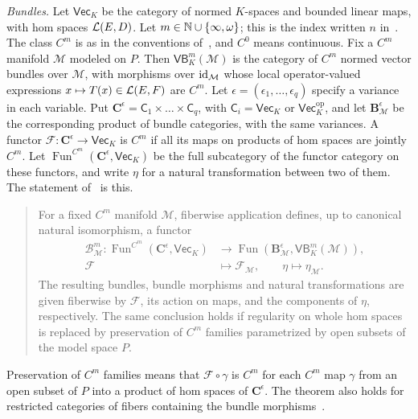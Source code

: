 \emph{Bundles.} Let $\mathsf{Vec}_K$ be the category of normed $K$-spaces and bounded linear maps, with hom spaces $\mathcal L(E,D)$. Let $m\in\mathbb N\cup\{\infty,\omega\}$; this is the index written $n$ in~\cite{I}. The class $C^m$ is as in the conventions of~\cite[Section~1]{I}, and $C^0$ means continuous. Fix a $C^m$ manifold $\mathcal M$ modeled on $P$. Then $\mathsf{VB}^m_K(\mathcal M)$ is the category of $C^m$ normed vector bundles over $\mathcal M$, with morphisms over $\mathrm{id}_{\mathcal M}$ whose local operator-valued expressions $x\mapsto T(x)\in\mathcal L(E,F)$ are $C^m$. Let $\epsilon=(\epsilon_1,\dots,\epsilon_q)$ specify a variance in each variable. Put $\mathbf C^\epsilon=\mathsf C_1\times\dots\times\mathsf C_q$, with $\mathsf C_i=\mathsf{Vec}_K$ or $\mathsf{Vec}_K^{\mathrm{op}}$, and let $\mathbf B^\epsilon_{\mathcal M}$ be the corresponding product of bundle categories, with the same variances. A functor $\mathcal F\colon\mathbf C^\epsilon\to\mathsf{Vec}_K$ is $C^m$ if all its maps on products of hom spaces are jointly $C^m$. Let $\operatorname{Fun}^{C^m}(\mathbf C^\epsilon,\mathsf{Vec}_K)$ be the full subcategory of the functor category on these functors, and write $\eta$ for a natural transformation between two of them. The statement of~\cite[Theorem~2.1]{I} is this.
\begin{quote}
For a fixed $C^m$ manifold $\mathcal M$, fiberwise application defines, up to canonical natural isomorphism, a functor
\[
\begin{aligned}
 \mathcal B^m_{\mathcal M}\colon
 \operatorname{Fun}^{C^m}(\mathbf C^\epsilon,\mathsf{Vec}_K)
 &\longrightarrow
 \operatorname{Fun}(\mathbf B^\epsilon_{\mathcal M},\mathsf{VB}^m_K(\mathcal M)),\\
 \mathcal F&\longmapsto\mathcal F_{\mathcal M},\qquad
 \eta\longmapsto\eta_{\mathcal M}.
\end{aligned}
\]
The resulting bundles, bundle morphisms and natural transformations are given fiberwise by $\mathcal F$, its action on maps, and the components of $\eta$, respectively. The same conclusion holds if regularity on whole hom spaces is replaced by preservation of $C^m$ families parametrized by open subsets of the model space $P$.
\end{quote}
Preservation of $C^m$ families means that $\mathcal F\circ\gamma$ is $C^m$ for each $C^m$ map $\gamma$ from an open subset of $P$ into a product of hom spaces of $\mathbf C^\epsilon$. The theorem also holds for restricted categories of fibers containing the bundle morphisms~\cite[text after Theorem~2.1]{I}.

